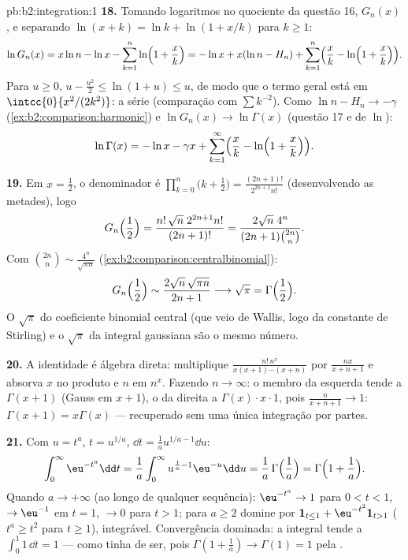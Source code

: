 \begin{solution}{pb:b2:integration:1}
\textbf{18.} Tomando logaritmos no quociente da questão 16,
$G_n(x)$, e separando $\ln(x+k) = \ln k + \ln(1 + x/k)$ para $k
\geq 1$:
\[
\ln G_n(x) = x\ln n - \ln x - \sum_{k=1}^n
\ln\Bigl(1+\frac xk\Bigr)
= -\ln x + x(\ln n - H_n)
+ \sum_{k=1}^n\Bigl(\frac xk -
\ln\Bigl(1+\frac xk\Bigr)\Bigr).
\]
Para $u \geq 0$, $u - \frac{u^2}2 \leq \ln(1+u) \leq u$, de modo que o
termo geral está em $\intcc{0}{x^2/(2k^2)}$: a série
 (comparação com $\sum k^{-2}$). Como $\ln n - H_n
\to -\gamma$ (\cref{ex:b2:comparison:harmonic}) e $\ln G_n(x)
\to \ln\Gamma(x)$ (questão 17 e  de $\ln$):
\[
\ln\Gamma(x) = -\ln x - \gamma x
+ \sum_{k=1}^\infty\Bigl(\frac xk -
\ln\Bigl(1+\frac xk\Bigr)\Bigr) .
\]

\textbf{19.} Em $x = \frac12$, o denominador é
$\prod_{k=0}^n\bigl(k+\frac12\bigr) =
\frac{(2n+1)!}{2^{2n+1}n!}$ (desenvolvendo as metades), logo
\[
G_n\Bigl(\frac12\Bigr)
= \frac{n!\,\sqrt n\;2^{2n+1}n!}{(2n+1)!}
= \frac{2\sqrt n\;4^n}{(2n+1)\binom{2n}{n}} .
\]
Com $\binom{2n}{n} \sim \frac{4^n}{\sqrt{\pi n}}$
(\cref{ex:b2:comparison:centralbinomial}):
\[
G_n\Bigl(\frac12\Bigr)
\sim \frac{2\sqrt n\,\sqrt{\pi n}}{2n+1}
\longrightarrow \sqrt\pi = \Gamma\Bigl(\frac12\Bigr) .
\]
O $\sqrt\pi$ do coeficiente binomial central (que veio de
Wallis, logo da constante de Stirling) e o $\sqrt\pi$ da integral
gaussiana são o mesmo número.

\textbf{20.} A identidade é álgebra direta: multiplique
$\frac{n!\,n^x}{x(x+1)\cdots(x+n)}$ por $\frac{nx}{x+n+1}$ e
absorva $x$ no produto e $n$ em $n^x$. Fazendo $n \to
\infty$: o membro da esquerda tende a $\Gamma(x+1)$ (Gauss em $x+1$),
o da direita a $\Gamma(x)\cdot x\cdot 1$, pois
$\frac{n}{x+n+1} \to 1$: $\Gamma(x+1) = x\Gamma(x)$ ---
recuperado sem uma única integração por partes.

\textbf{21.} Com $u = t^a$, $t = u^{1/a}$, $\dd t = \frac1a
u^{1/a - 1}\dd u$:
\[
\int_0^\infty \eu^{-t^a}\dd t
= \frac1a\int_0^\infty u^{\frac1a - 1}\eu^{-u}\dd u
= \frac1a\,\Gamma\Bigl(\frac1a\Bigr)
= \Gamma\Bigl(1 + \frac1a\Bigr) .
\]
Quando $a \to +\infty$ (ao longo de qualquer sequência): $\eu^{-t^a} \to 1$ para
$0 < t < 1$, $\to \eu^{-1}$ em $t = 1$, $\to 0$ para $t > 1$;
para $a \geq 2$ domine por $\mathbf 1_{t \leq 1} +
\eu^{-t^2}\mathbf 1_{t > 1}$ ($t^a \geq t^2$ para $t \geq 1$),
integrável. Convergência dominada: a integral tende a
$\int_0^1 1\,\dd t = 1$ --- como tinha de ser, pois $\Gamma(1 +
\frac1a) \to \Gamma(1) = 1$ pela .


\end{solution}

